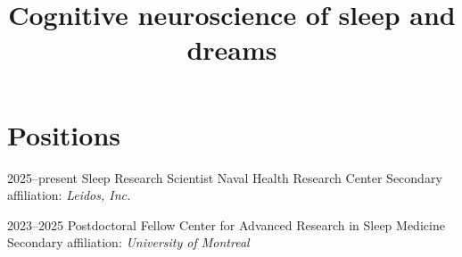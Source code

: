 \documentclass[11pt,a4paper,sans]{moderncv}
\title{Cognitive neuroscience of sleep and dreams}
\begin{document}
% 


\makecvtitle


\section{Positions}

\cventry
    {2025--present}
    {Sleep Research Scientist}
    {Naval Health Research Center}
    {}
    {}
    {
        Secondary affiliation: \textit{Leidos, Inc.}
    }

\cventry
    {2023--2025}
    {Postdoctoral Fellow}
    {Center for Advanced Research in Sleep Medicine}
    {}
    {}
    {
        Secondary affiliation: \textit{University of Montreal}
    }
\end{document}
